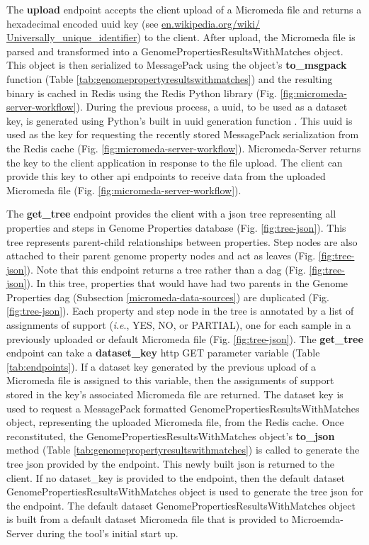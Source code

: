 The \textbf{upload} endpoint accepts the client upload of a Micromeda file and 
returns a hexadecimal encoded \gls{uuid} key \cite{leach2005universally} (see 
\href{http://en.wikipedia.org/wiki/Universally_unique_identifier}{en.wikipedia.org/wiki/ 
Universally\_unique\_identifier}) to the client. After upload, the Micromeda 
file is parsed and transformed into a GenomePropertiesResultsWithMatches object. 
This object is then serialized to MessagePack using the object's 
\textbf{to\_msgpack} function (Table \ref{tab:genomepropertyresultswithmatches}) 
and the resulting binary is cached in Redis using the Redis Python library 
\cite{mccurdy_2019} (Fig. \ref{fig:micromeda-server-workflow}). During the 
previous process, a \gls{uuid}, to be used as a dataset key, is generated using 
Python's built in \gls{uuid} generation function \cite{PythonUUID}. This 
\gls{uuid} is used as the key for requesting the recently stored MessagePack 
serialization from the Redis cache (Fig. \ref{fig:micromeda-server-workflow}). 
Micromeda-Server returns the key to the client application in response to the 
file upload. The client can provide this key to other \gls{api} endpoints to 
receive data from the uploaded Micromeda file (Fig. 
\ref{fig:micromeda-server-workflow}). 

The \textbf{get\_tree} endpoint provides the client with a \gls{json} tree 
representing all properties and steps in Genome Properties database (Fig. 
\ref{fig:tree-json}). This tree represents parent-child relationships between 
properties. Step nodes are also attached to their parent genome property nodes 
and act as leaves (Fig. \ref{fig:tree-json}). Note that this endpoint returns a 
tree rather than a \gls{dag} (Fig. \ref{fig:tree-json}). In this tree, 
properties that would have had two parents in the Genome Properties \gls{dag} 
(Subsection \ref{micromeda-data-sources}) are duplicated (Fig. 
\ref{fig:tree-json}). Each property and step node in the tree is annotated by a 
list of assignments of support (\textit{i}.\textit{e}., YES, NO, or PARTIAL), one 
for each sample in a previously uploaded or default Micromeda file (Fig. 
\ref{fig:tree-json}). The \textbf{get\_tree} endpoint can take a 
\textbf{dataset\_key} \gls{http} GET parameter variable (Table 
\ref{tab:endpoints}). If a dataset key generated by the previous upload of a 
Micromeda file is assigned to this variable, then the assignments of support 
stored in the key's associated Micromeda file are returned. The dataset key is 
used to request a MessagePack formatted GenomePropertiesResultsWithMatches 
object, representing the uploaded Micromeda file, from the Redis cache. Once 
reconstituted, the GenomePropertiesResultsWithMatches object's \textbf{to\_json} 
method (Table \ref{tab:genomepropertyresultswithmatches}) is called to generate 
the tree \gls{json} provided by the endpoint. This newly built \gls{json} 
is returned to the client. If no dataset\_key is provided to the endpoint, then 
the default dataset GenomePropertiesResultsWithMatches object is used 
to generate the tree \gls{json} for the endpoint. The default dataset 
GenomePropertiesResultsWithMatches object is built from a default dataset 
Micromeda file that is provided to Microemda-Server during the tool's initial 
start up.

